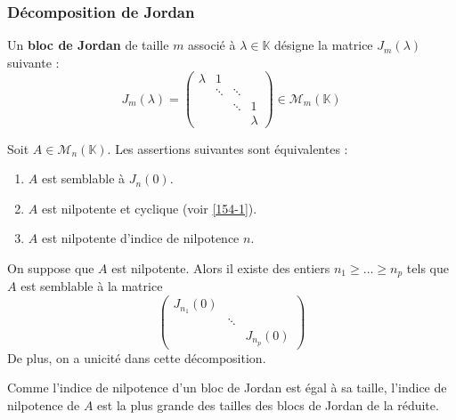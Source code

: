   \subsubsection{Décomposition de Jordan}


  \begin{definition}
    Un \textbf{bloc de Jordan} de taille $m$ associé à $\lambda \in \mathbb{K}$ désigne la matrice $J_m(\lambda)$ suivante :
    \[ J_m(\lambda) = \begin{pmatrix} \lambda & 1 & \\ & \ddots & \ddots & \\ & & \ddots & 1 \\ & & & \lambda \end{pmatrix} \in \mathcal{M}_m(\mathbb{K}) \]
  \end{definition}

  \begin{proposition}
    Soit $A \in \mathcal{M}_n(\mathbb{K})$. Les assertions suivantes sont équivalentes :
    \begin{enumerate}[label=(\roman*)]
      \item $A$ est semblable à $J_n(0)$.
      \item $A$ est nilpotente et cyclique (voir \cref{154-1}).
      \item $A$ est nilpotente d'indice de nilpotence $n$.
    \end{enumerate}
  \end{proposition}

  \begin{theorem}
    On suppose que $A$ est nilpotente. Alors il existe des entiers $n_1 \geq \dots \geq n_p$ tels que $A$ est semblable à la matrice
    \[ \begin{pmatrix} J_{n_1}(0) & & \\ & \ddots & \\ & & J_{n_p}(0) \end{pmatrix} \]
    De plus, on a unicité dans cette décomposition.
  \end{theorem}

  \begin{remark}
    Comme l'indice de nilpotence d'un bloc de Jordan est égal à sa taille, l'indice de nilpotence de $A$ est la plus grande des tailles des blocs de Jordan de la réduite.
  \end{remark}


